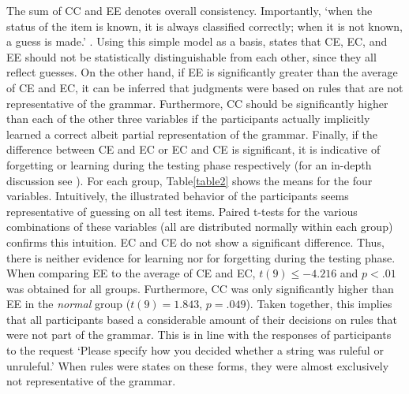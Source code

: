 The sum of CC and EE denotes overall consistency. Importantly, `when the status of the item is known, it is always classified correctly; when it is not known, a guess is made.' \citep[p.~227]{reber1989implicit}. Using this simple model as a basis, \citeauthor{reber1989implicit} states that CE, EC, and EE should not be statistically distinguishable from each other, since they all reflect guesses. On the other hand, if EE is significantly greater than the average of CE and EC, it can be inferred that judgments were based on rules that are not representative of the grammar. Furthermore, CC should be significantly higher than each of the other three variables if the participants actually implicitly learned a correct albeit partial representation of the grammar. Finally, if the difference between CE and EC or EC and CE is significant, it is indicative of forgetting or learning during the testing phase respectively (for an in-depth discussion see \citet{reber1989implicit}). For each group, Table\ref{table2} shows the means for the four variables. Intuitively, the illustrated behavior of the participants seems representative of guessing on all test items. Paired t-tests for the various combinations of these variables (all are distributed normally within each group) confirms this intuition. EC and CE do not show a significant difference. Thus, there is neither evidence for learning nor for forgetting during the testing phase. When comparing EE to the average of CE and EC, $t(9) \leq -4.216$ and $p < .01$ was obtained for all groups. Furthermore, CC was only significantly higher than EE in the \textit{normal} group ($t(9)=1.843$, $p=.049$). Taken together, this implies that all participants based a considerable amount of their decisions on rules that were not part of the grammar. This is in line with the responses of participants to the request `Please specify how you decided whether a string was ruleful or unruleful.' When rules were states on these forms, they were almost exclusively not representative of the grammar. 
